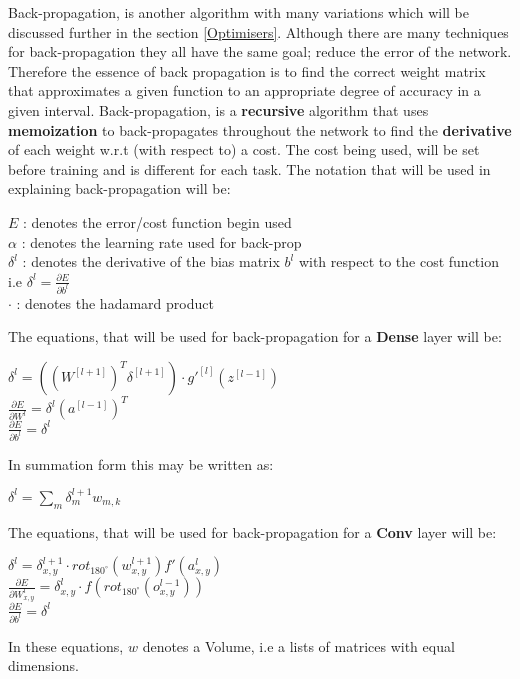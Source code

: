  \label{SBack-propagation}
Back-propagation, is another algorithm with many variations which will be discussed further in the section \ref{Optimisers}. Although there are many techniques for back-propagation they all have the same goal; reduce the error of the network. Therefore the essence of back propagation is to find the correct weight matrix that approximates a given function to an appropriate degree of accuracy in a given interval. Back-propagation, is a \textbf{recursive} algorithm that uses \textbf{memoization} to back-propagates throughout the network to find the \textbf{derivative} of each weight w.r.t (with respect to) a cost. The cost being used, will be set before training and is different for each task.
The notation that will be used in explaining back-propagation will be:

\begin{center}
    $E$ : denotes the error/cost function begin used \\
    $\alpha$ : denotes the learning rate used for back-prop \\
    $\delta^{l}$ : denotes the derivative of the bias matrix $b^{l}$ with respect to the cost function i.e $ \delta^{l} = \frac{\partial E}{\partial b^{l}}$ \\
    $\cdot$ : denotes the hadamard product
\end{center}

The equations, that will be used for back-propagation for a \textbf{Dense} layer will be:
\begin{center}
    $\delta^{l} = ((W^{[l+1]})^{T}\delta^{[l+1]}) \cdot g'^{[l]}(z^{[l-1]})$ \\
    $\frac{\partial E}{\partial W^{l}} = \delta^{l}(a^{[l-1]})^T$ \\
    $\frac{\partial E}{\partial b^{l}} = \delta^{l}$
\end{center}

In summation form this may be written as:

\begin{center}
    $\delta^{l} = \sum_{m} \delta_{m}^{l+1}w_{m,k}$ \\
\end{center}


The equations, that will be used for back-propagation for a \textbf{Conv} layer will be:
\begin{center}
    $\delta^{l} = \delta^{l+1}_{x,y} \cdot rot_{180^\circ}(w^{l+1}_{x,y}) f'(a^{l}_{x,y})$ \\
    $\frac{\partial E}{\partial W^{l}_{x,y}} = \delta^{l}_{x,y} \cdot f(rot_{180^\circ} (o^{l-1}_{x,y}))$ \\
    $\frac{\partial E}{\partial b^{l}} = \delta^{l}$
\end{center}
In these equations, $w$ denotes a Volume, i.e a lists of matrices with equal dimensions.

